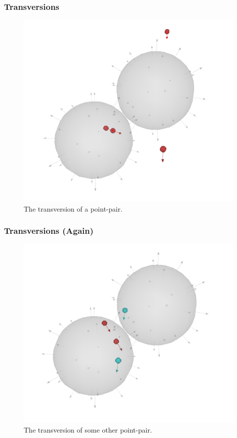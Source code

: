 \documentclass{beamer}
\begin{document}
\begin{frame}
\frametitle{Transversions}
\begin{figure}
\centering
\includegraphics[scale=0.4]{TransversionOne}
\caption{The transversion of a point-pair.}
\end{figure}
\end{frame}

\begin{frame}
\frametitle{Transversions (Again)}
\begin{figure}
\centering
\includegraphics[scale=0.4]{TransversionTwo}
\caption{The transversion of some other point-pair.}
\end{figure}
\end{frame}
\end{document}
